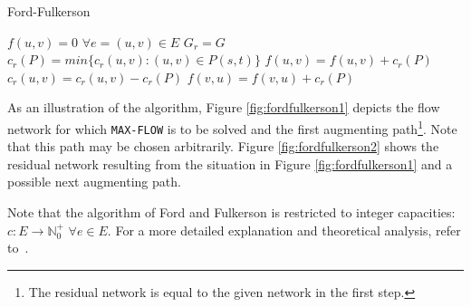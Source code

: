 \documentclass[a4paper,10pt, twocolumn]{article}
\begin{document}
\begin{algorithm}
\caption{Ford-Fulkerson}
\label{algo:fordFulkerson}
\begin{algorithmic}[1]
	\State $f(u,v) = 0$ $\forall e=(u,v) \in E$ 
	\State  $G_r = G$ 
	\State $c_r(P) = min \{c_r(u,v): (u,v) \in P(s,t) \}$
		\State $f(u,v) = f(u,v) + c_r(P)$ 
		\State $c_r(u,v) = c_r(u,v) - c_r(P)$
		\State $f(v,u) = f(v,u) + c_r(P)$ 
	\EndWhile
	\EndFunction
\end{algorithmic}
\end{algorithm}

As an illustration of the algorithm, Figure \ref{fig:fordfulkerson1} depicts the flow network for which \lstinline|MAX-FLOW| is to be solved and the first augmenting path\footnote{The residual network is equal to the given network in the first step.}. Note that this path may be chosen arbitrarily. Figure \ref{fig:fordfulkerson2} shows the residual network resulting from the situation in Figure \ref{fig:fordfulkerson1} and a possible next augmenting path. 

Note that the algorithm of Ford and Fulkerson is restricted to integer capacities:  $c:E\rightarrow \mathbb{N}_0^{+}$ $\forall e \in E$. For a more detailed explanation and theoretical analysis, refer to~\cite{ahuja93}.
\end{document}
